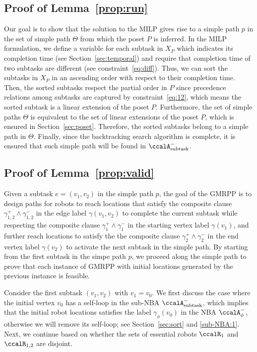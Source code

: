 \documentclass[Afour,sageh,times]{sagej}
\newcommand{\auto}[1]{\ccalA_{\textup{#1}}}
\newcommand{\autop}{\ccalA_{\phi}}
\begin{document}
{{\subsection{Proof of Lemma~\ref{prop:run}}\label{app:run}
Our goal is to show that the solution to the MILP gives rise to a simple path $p$ in the set of simple path $\Theta$ from which the poset $P$ is inferred. In the MILP formulation, we define a variable for each subtask in $X_P$ which indicates its completion time (see Section~\ref{sec:temporal}) and require that completion time of two subtasks are different (see constraint~\eqref{eq:diff}).  Thus, we can sort the subtasks in $X_P$  in an ascending order with respect to their completion time. Then, the sorted subtasks respect the partial order in $P$ since precedence relations among subtasks are captured by constraint~\eqref{eq:12}, which means the sorted subtask is a linear extension of the poset $P$. Furthermore, the set of simple paths $\Theta$ is equivalent to the set of  linear extensions of the poset $P$, which is ensured in Section~\ref{sec:poset}. Therefore, the sorted subtasks belong to a simple path in $\Theta$. Finally, since the  backtracking search algorithm is complete, it is ensured that such simple path will be found in $\auto{subtask}^-$.

\subsection{Proof of Lemma~\ref{prop:valid}}\label{app:valid}
Given a subtask $e = (v_1, v_2)$ in the simple path $p$, the goal of the GMRPP is to design paths for robots to reach locations that satisfy the composite clause $\gamma_{1,2}^+ \wedge \gamma_{1,2}^-$ in the edge label $\gamma(v_1, v_2)$ to complete the current subtask while respecting the composite clause $\gamma_1^+ \wedge \gamma_1^-$ in the starting vertex label $\gamma(v_1)$, and further reach locations to satisfy the the composite clause $\gamma_2^+ \wedge \gamma_2^-$  in the end vertex label $\gamma(v_2)$ to activate the next subtask in the simple path. By starting from the first subtask in the simpe path $p$, we proceed along the simple path to prove that each instance of GMRPP with initial locations generated by the previous instance is feasible.


Consider the first subtask $(v_1, v_2)$ with $v_1 = v_0$. We first discuss the case where  the initial vertex $v_0$ has a self-loop in the sub-NBA $\auto{subtask}^-$, which implies that the initial robot locations satisfies the label $\gamma_{\phi}(v_0)$ in the NBA $\autop^-$, otherwise we will remove its self-loop; see Section~\ref{sec:sort} and \ref{sub-NBA:1}. Next, we continue based on whether the sets of essential robots $\ccalR_1$ and $\ccalR_{1,2}$ are disjoint.

}}
\end{document}

